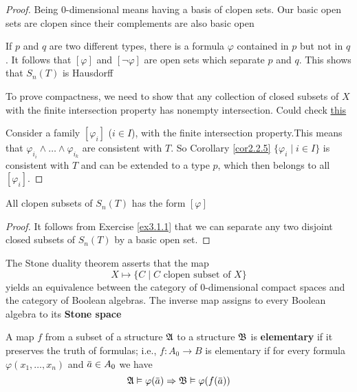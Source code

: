 \documentclass[11pt]{article}
\begin{document}
\begin{proof}
Being 0-dimensional means having a basis of clopen sets. Our basic open sets
are clopen since their complements are also basic open

If \(p\) and \(q\) are two different types, there is a formula \(\varphi\) contained in
\(p\) but not in \(q\). It follows that \([\varphi]\) and \([\neg\varphi]\) are
open sets which separate \(p\) and \(q\). This shows that \(S_n(T)\) is
Hausdorff

To prove compactness, we need to show that any collection of closed subsets
of \(X\) with the finite intersection property has nonempty intersection.
Could check  \href{http://www.msc.uky.edu/droyster/courses/fall99/math4181/classnotes/notes5.pdf}{this}

Consider a family \([\varphi_i]\) (\(i\in I\)), with the finite intersection property.This
means that \(\varphi_{i_i}\wedge\dots\wedge\varphi_{i_k}\) are consistent
with \(T\). So Corollary \ref{cor2.2.5} \(\{\varphi_i\mid i\in I\}\) is
consistent with \(T\) and can be extended to a type \(p\), which then belongs
to all \([\varphi_i]\).  
\end{proof}

\begin{lemma}[]
All clopen subsets of \(S_n(T)\) has the form \([\varphi]\)
\end{lemma}

\begin{proof}
It follows from Exercise \ref{ex3.1.1} that we can separate any two disjoint
closed subsets of \(S_n(T)\) by a basic open set.
\end{proof}

The Stone duality theorem asserts that the map
\begin{equation*}
X\mapsto\{C\mid C\text{ clopen subset of }X\}
\end{equation*}
yields an equivalence between the category of 0-dimensional compact spaces
and the category of Boolean algebras. The inverse map assigns to every
Boolean algebra to its \textbf{Stone space}

\begin{definition}[]
A map \(f\) from a subset of a structure \(\mathfrak{A}\) to a structure \(\mathfrak{B}\) is
\textbf{elementary} if it preserves the truth of formulas; i.e., \(f:A_0\to B\) is
elementary if for every formula \(\varphi(x_1,\dots,x_n)\) and \(\bbar{a}\in A_0\)
we have
\begin{equation*}
\fA\vDash\varphi(\bbar{a})\Rightarrow\fB\vDash\varphi(f(\bbar{a}))
\end{equation*}
\end{definition}
\end{document}
